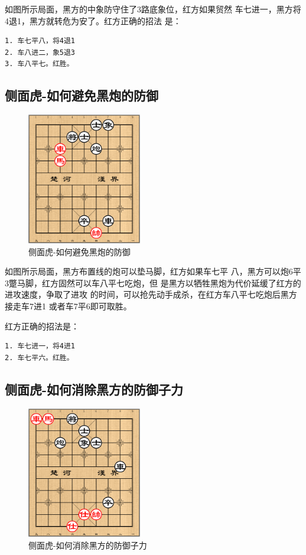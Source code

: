 \documentclass[a5paper,twoside]{book}
\begin{document}
如图所示局面，黑方的中象防守住了3路底象位，红方如果贸然
车七进一，黑方将4退1，黑方就转危为安了。红方正确的招法
是：

\begin{verbatim}
1. 车七平八，将4退1
2. 车八进二，象5退3
3. 车八平七。红胜。
\end{verbatim}

\subsection{侧面虎-如何避免黑炮的防御}
\label{sec-4-3-2}

\begin{figure}[H]
\centering
\includegraphics[width=5cm]{pic/侧面虎-如何破除黑炮的防御.png}
\caption{侧面虎-如何避免黑炮的防御}
\end{figure}


如图所示局面，黑方布置线的炮可以垫马脚，红方如果车七平
八，黑方可以炮6平3蹩马脚，红方固然可以车八平七吃炮，但
是黑方以牺牲黑炮为代价延缓了红方的进攻速度，争取了进攻
的时间，可以抢先动手成杀，在红方车八平七吃炮后黑方接走车7进1
或者车7平6即可取胜。

红方正确的招法是：

\begin{verbatim}
1. 车七进一，将4进1
2. 车七平六。红胜。
\end{verbatim}

\subsection{侧面虎-如何消除黑方的防御子力}
\label{sec-4-3-3}
\begin{figure}[H]
\centering
\includegraphics[width=5cm]{pic/侧面虎-如何消除黑方的防御子力.png}
\caption{侧面虎-如何消除黑方的防御子力}
\end{figure}
\end{document}
